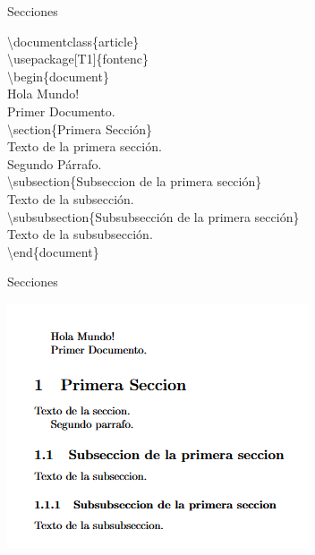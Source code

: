 \documentclass[12pt]{beamer}
\begin{document}
\begin{frame}{Secciones}
  \begin{center}
    \begin{minipage}{0.8\textwidth}
  \begin{block}{}
    \footnotesize
    \textbackslash documentclass\{article\}\\
    \textbackslash usepackage[T1]\{fontenc\}\\
    \textbackslash begin\{document\}\\
\hspace{1cm}Hola Mundo!\\[10pt]
\hspace{1cm}Primer Documento.\\[10pt]

\hspace{1cm}\textbackslash section\{Primera Sección\}\\
\hspace{1cm}Texto de la primera sección.\\[10pt]

\hspace{1cm}Segundo Párrafo.\\[10pt]

\hspace{1cm}\textbackslash subsection\{Subseccion de la primera sección\}\\

\hspace{1cm}Texto de la subsección.\\[10pt]

\hspace{1cm}\textbackslash subsubsection\{Subsubsección de la primera sección\}\\

\hspace{1cm}Texto de la subsubsección.\\

\textbackslash end\{document\}\\
  \end{block}
  \end{minipage}
  \end{center}
\end{frame}
\begin{frame}{Secciones}
  \begin{center}
    \includegraphics[scale=0.9]{Secciones.png}  
  \end{center}
\end{frame}
\end{document}
